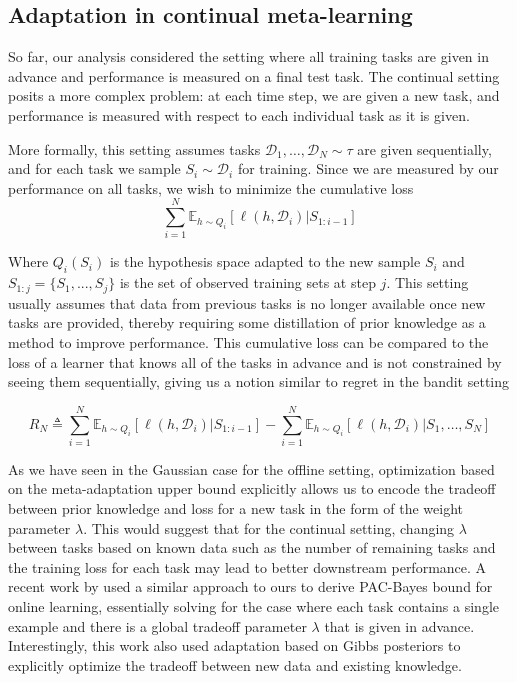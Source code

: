 \documentclass{article}
\theoremstyle{definition}
\newcommand{\Expect}[2]{\mathbb{E}_{#1}\left [#2 \right ]}
\begin{document}
\subsection{Adaptation in continual meta-learning}

So far, our analysis considered the setting where all training tasks are given in advance and performance is measured on a final test task. The continual setting posits a more complex problem: at each time step, we are given a new task, and performance is measured with respect to each individual task as it is given. 

More formally, this setting assumes tasks $\mathcal{D}_1,\ldots,\mathcal{D}_N\sim \tau$ are given sequentially, and for each task we sample $S_i\sim \mathcal{D}_i$ for training. Since we are measured by our performance on all tasks, we wish to minimize the cumulative loss
$$\sum_{i=1}^{N}\Expect{h\sim Q_i}{\ell(h, \mathcal{D}_i)| S_{1:i-1}}$$

Where $Q_i(S_i)$ is the hypothesis space adapted to the new sample $S_i$ and $S_{1:j}=\{S_1,...,S_j\}$ is the set of observed training sets at step $j$.
This setting usually assumes that data from previous tasks is no longer available once new tasks are provided, thereby requiring some distillation of prior knowledge as a method to improve performance.
This cumulative loss can be compared to the loss of a learner that knows all of the tasks in advance and is not constrained by seeing them sequentially, giving us a notion similar to regret in the bandit setting

$$R_N\triangleq \sum_{i=1}^{N}\Expect{h\sim Q_i}{\ell(h, \mathcal{D}_i)| S_{1:i-1}}-\sum_{i=1}^{N}\Expect{h\sim Q_i}{\ell(h,\mathcal{D}_i)|S_1,\ldots,S_N}$$

As we have seen in the Gaussian case for the offline setting, optimization based on the meta-adaptation upper bound explicitly allows us to encode the tradeoff between prior knowledge and loss for a new task in the form of the weight parameter $\lambda$.
This would suggest that for the continual setting, changing $\lambda$ between tasks based on known data such as the number of remaining tasks and the training loss for each task may lead to better downstream performance. 
A recent work by \citet{Haddouche2022} used a similar approach to ours to derive PAC-Bayes bound for online learning, essentially solving for the case where each task contains a single example and there is a global tradeoff parameter $\lambda$ that is given in advance. Interestingly, this work also used adaptation based on Gibbs posteriors to explicitly optimize the tradeoff between new data and existing knowledge.
\end{document}
